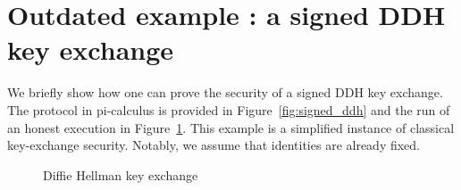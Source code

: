 \section{Outdated example : a signed DDH key exchange}

We briefly show how one can prove the security of a signed DDH key exchange. The protocol in pi-calculus is provided in Figure~\ref{fig:signed_ddh} and the run of an honest execution in Figure~\ref{fig:dh_ke}. This example is a simplified instance of classical key-exchange security. Notably, we assume that identities are already fixed.

\begin{figure}
  \setmsckeyword{} 
  \begin{center}
    \begin{msc}{}
      \setlength{\instwidth}{0\mscunit}
      \setlength{\instdist}{7cm}
      \setlength{\topheaddist}{0cm}


      \nextlevel[-1]
      \nextlevel[1.5]
      \nextlevel[1.5]




    \end{msc}
  \end{center}
  \caption{Diffie Hellman key exchange}\label{fig:dh_ke}
\end{figure}

